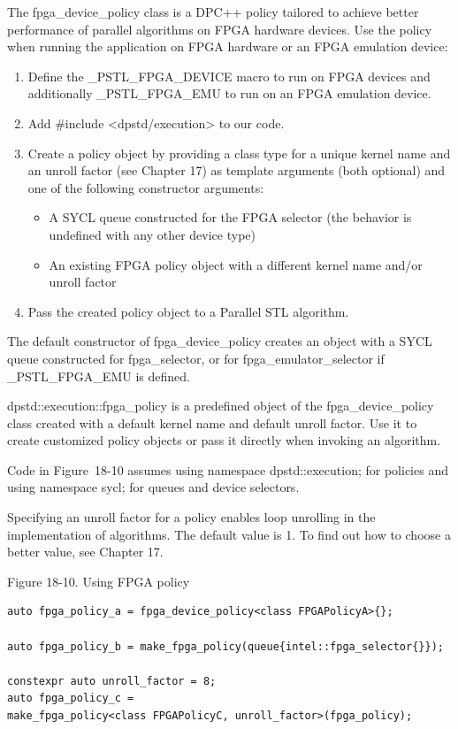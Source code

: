 The fpga\_device\_policy class is a DPC++ policy tailored to achieve better performance of parallel algorithms on FPGA hardware devices. Use the policy when running the application on FPGA hardware or an FPGA emulation device:\par

\begin{enumerate}
	\item Define the \_PSTL\_FPGA\_DEVICE macro to run on FPGA devices and additionally \_PSTL\_FPGA\_EMU to run on an FPGA emulation device.
	\item Add \#include <dpstd/execution> to our code.
	\item Create a policy object by providing a class type for a unique kernel name and an unroll factor (see Chapter 17) as template arguments (both optional) and one of the following constructor arguments:
	\begin{itemize}
		\item A SYCL queue constructed for the FPGA selector (the behavior is undefined with any other device type)
		\item An existing FPGA policy object with a different kernel name and/or unroll factor
	\end{itemize}
	\item Pass the created policy object to a Parallel STL algorithm.
\end{enumerate}

The default constructor of fpga\_device\_policy creates an object with a SYCL queue constructed for fpga\_selector, or for fpga\_emulator\_selector if \_PSTL\_FPGA\_EMU is defined.\par

dpstd::execution::fpga\_policy is a predefined object of the fpga\_device\_policy class created with a default kernel name and default unroll factor. Use it to create customized policy objects or pass it directly when invoking an algorithm.\par

Code in Figure 18-10 assumes using namespace dpstd::execution; for policies and using namespace sycl; for queues and device selectors.\par

Specifying an unroll factor for a policy enables loop unrolling in the implementation of algorithms. The default value is 1. To find out how to choose a better value, see Chapter 17.\par

\hspace*{\fill} \par %
Figure 18-10. Using FPGA policy
\begin{lstlisting}[caption={}]
auto fpga_policy_a = fpga_device_policy<class FPGAPolicyA>{};

auto fpga_policy_b = make_fpga_policy(queue{intel::fpga_selector{}});

constexpr auto unroll_factor = 8;
auto fpga_policy_c = 
make_fpga_policy<class FPGAPolicyC, unroll_factor>(fpga_policy);
\end{lstlisting}

